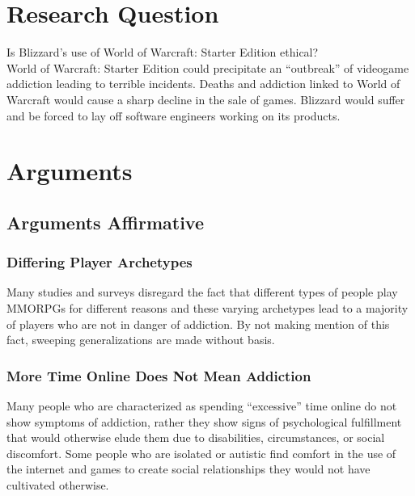 \documentclass[11pt]{article}
\begin{document}
\begin{multicols}{2}
\section{Research Question}
Is Blizzard's use of World of Warcraft: Starter Edition ethical? \\
World of Warcraft: Starter Edition could precipitate an ``outbreak'' of videogame addiction leading to terrible incidents. \cite{SnowlyDeath} Deaths and addiction linked to World of Warcraft would cause a sharp decline in the sale of games. Blizzard would suffer and be forced to lay off software engineers working on its products.



\section{Arguments}
\subsection{Arguments Affirmative}
\subsubsection{Differing Player Archetypes}
Many studies and surveys disregard the fact that different types of people play MMORPGs for different reasons and these varying archetypes lead to a majority of players who are not in danger of addiction. By not making mention of this fact, sweeping generalizations are made without basis. \cite{PlayerMotivations}
\subsubsection{More Time Online Does Not Mean Addiction}
Many people who are characterized as spending ``excessive'' time online do not show symptoms of addiction, rather they show signs of psychological fulfillment that would otherwise elude them due to disabilities, circumstances, or social discomfort. Some people who are isolated or autistic find comfort in the use of the internet and games to create social relationships they would not have cultivated otherwise. \cite{IsThereEvidenceOfInternetAddiction}

\end{multicols}
\end{document}

